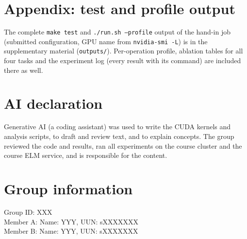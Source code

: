 \documentclass{article}
\begin{document}



\appendix
\section{Appendix: test and profile output}
The complete \texttt{make test} and \texttt{./run.sh --profile} output of the hand-in job (submitted configuration, GPU name from \texttt{nvidia-smi -L}) is in the supplementary material (\texttt{outputs/}). Per-operation profile, ablation tables for all four tasks and the experiment log (every result with its command) are included there as well.

\newpage
\section*{AI declaration}
Generative AI (a coding assistant) was used to write the CUDA kernels and analysis scripts, to draft and review text, and to explain concepts. The group reviewed the code and results, ran all experiments on the course cluster and the course ELM service, and is responsible for the content.
\section*{Group information}
Group ID: XXX\\
Member A: Name: YYY, UUN: sXXXXXXX\\
Member B: Name: YYY, UUN: sXXXXXXX
\end{document}
